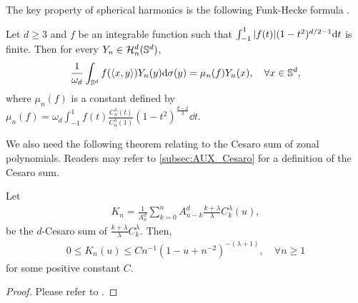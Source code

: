 The key property of spherical harmonics is the following Funk-Hecke formula
\citep[Theorem 1.2.9]{dai2013_ApproximationTheory}.
\begin{proposition}
  \label{prop:seca_FunkFormula}
  Let $d \geq 3$ and $f$ be an integrable function such that $\int_{-1}^1 \abs{f(t)} (1-t^2)^{d/2-1} \dd t$ is finite.
  Then for every $Y_n \in \mathcal{H}^d_n(\mathbb{S}^d)$,
  \begin{align}
    \label{eq:C_FunkHecke}
    \frac{1}{\omega_d}\int_{\mathbb{S}^d} f(\left\langle{x,y}\right\rangle) Y_n(y) \dd \sigma(y) = \mu_n(f) Y_n(x),\quad \forall x \in \mathbb{S}^{d},
  \end{align}
  where $\mu_n(f)$ is a constant defined by
  $\mu_n(f) = \omega_d \int_{-1}^1 f(t) \frac{C_n^\lambda(t)}{C_n^\lambda(1)} (1-t^2)^{\frac{d-2}{2}} \dd t.$
\end{proposition}


We also need the following theorem relating to the Cesaro sum of zonal polynomials.
Readers may refer to \cref{subsec:AUX_Cesaro} for a definition of the Cesaro sum.

\begin{proposition}
  \label{prop:seca_CesaroJacobiPoly}
  Let
  \begin{align}
    \label{eq:C_CesaroKn}
    K_n = \frac{1}{A_n^d}\sum_{k=0}^n A_{n-k}^{d} \frac{k+\lambda}{\lambda} C^{\lambda}_k(u),
  \end{align}
  be the $d$-Cesaro sum of $\frac{k+\lambda}{\lambda}C_k^\lambda$.
  Then,
  \begin{align}
    \label{eq:C_Kn_PositiveAndBound}
    0 \leq K_n(u) \leq C n^{-1} (1-u+n^{-2})^{-(\lambda+1)},\quad \forall n \geq 1
  \end{align}
  for some positive constant $C$.
\end{proposition}
\begin{proof}
  Please refer to \citet[Theorem 2.4.3 and Lemma 2.4.6]{dai2013_ApproximationTheory}.
\end{proof}

